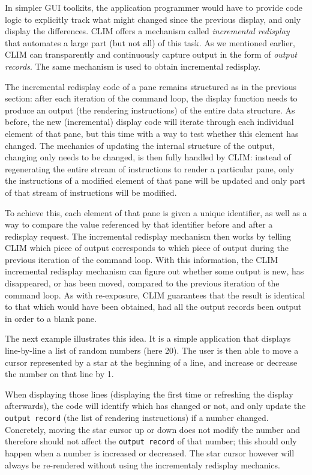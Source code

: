 In simpler GUI toolkits, the application programmer would have to
provide code logic to explicitly track what might changed since the
previous display, and only display the differences.  CLIM offers a
mechanism called \emph{incremental redisplay} that automates a large
part (but not all) of this task.  As we mentioned earlier, CLIM can
transparently and continuously capture output in the form of
\emph{output records}.  The same mechanism is used to obtain
incremental redisplay.

The incremental redisplay code of a pane remains structured as in the
previous section: after each iteration of the command loop, the
display function needs to produce an output (the rendering
instructions) of the entire data structure. As before, the new
(incremental) display code will iterate through each individual
element of that pane, but this time with a way to test whether this
element has changed. The mechanics of updating the internal structure
of the output, changing only needs to be changed, is then fully
handled by CLIM: instead of regenerating the entire stream of
instructions to render a particular pane, only the instructions of a
modified element of that pane will be updated and only part of that
stream of instructions will be modified.

To achieve this, each element of that pane is given a unique
identifier, as well as a way to compare the value referenced by that
identifier before and after a redisplay request.  The incremental
redisplay mechanism then works by telling CLIM which piece of output
corresponds to which piece of output during the previous iteration of
the command loop. With this information, the CLIM incremental
redisplay mechanism can figure out whether some output is new, has
disappeared, or has been moved, compared to the previous iteration of
the command loop.  As with re-exposure, CLIM guarantees that the
result is identical to that which would have been obtained, had all
the output records been output in order to a blank pane.

The next example illustrates this idea.  It is a simple application
that displays line-by-line a list of random numbers (here 20). The
user is then able to move a cursor represented by a star at the
beginning of a line, and increase or decrease the number on that line
by 1.

When displaying those lines (displaying the first time or refreshing
the display afterwards), the code will identify which has changed or
not, and only update the \texttt{output record} (the list of rendering
instructions) if a number changed. Concretely, moving the star cursor
up or down does not modify the number and therefore should not affect
the \texttt{output record} of that number; this should only happen
when a number is increased or decreased. The star cursor however will
always be re-rendered without using the incrementaly redisplay
mechanics.


